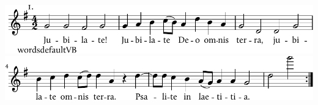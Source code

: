 \includegraphics{9792418ad1dc30119aba69d2bc910bf0-1}%
\ifx\betweenLilyPondSystem \undefined
  \linebreak
\else
  \expandafter{}%
\fi
\includegraphics{9792418ad1dc30119aba69d2bc910bf0-2}%
